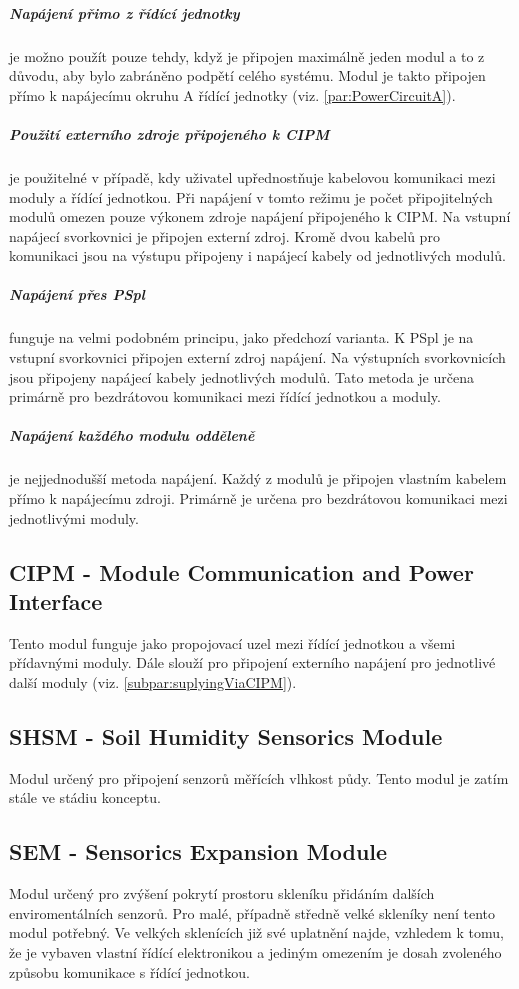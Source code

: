 \subparagraph{Napájení přimo z řídící jednotky}
je možno použít pouze tehdy, když je připojen maximálně jeden modul a to z důvodu, aby bylo zabráněno podpětí celého systému.
Modul je takto připojen přímo k napájecímu okruhu A řídící jednotky (viz. \autoref{par:PowerCircuitA}).

\subparagraph{Použití externího zdroje připojeného k CIPM}
\label{subpar:suplyingViaCIPM}
je použitelné v případě, kdy uživatel upřednostňuje kabelovou komunikaci mezi moduly a řídící jednotkou.
Při napájení v tomto režimu je počet připojitelných modulů omezen pouze výkonem zdroje napájení připojeného k CIPM.
Na vstupní napájecí svorkovnici je připojen externí zdroj. 
Kromě dvou kabelů pro komunikaci jsou na výstupu připojeny i napájecí kabely od jednotlivých modulů.

\subparagraph{Napájení přes PSpl}
funguje na velmi podobném principu, jako předchozí varianta. 
K PSpl je na vstupní svorkovnici připojen externí zdroj napájení.
Na výstupních svorkovnicích jsou připojeny napájecí kabely jednotlivých modulů.
Tato metoda je určena primárně pro bezdrátovou komunikaci mezi řídící jednotkou a moduly.

\subparagraph{Napájení každého modulu odděleně}
je nejjednodušší metoda napájení.
Každý z modulů je připojen vlastním kabelem přímo k napájecímu zdroji.
Primárně je určena pro bezdrátovou komunikaci mezi jednotlivými moduly. 

\subsection{CIPM - Module Communication and Power Interface}
\label{subsec:CIPM}
Tento modul funguje jako propojovací uzel mezi řídící jednotkou a všemi přídavnými moduly.
Dále slouží pro připojení externího napájení pro jednotlivé další moduly (viz. \autoref{subpar:suplyingViaCIPM}).

\subsection{SHSM - Soil Humidity Sensorics Module}
\label{subsec:SHSM}
Modul určený pro připojení senzorů měřících vlhkost půdy.
Tento modul je zatím stále ve stádiu konceptu.

\subsection{SEM - Sensorics Expansion Module}
\label{subsec:SEM}
Modul určený pro zvýšení pokrytí prostoru skleníku přidáním dalších enviromentálních senzorů.
Pro malé, případně středně velké skleníky není tento modul potřebný. 
Ve velkých sklenících již své uplatnění najde, vzhledem k tomu, že je vybaven vlastní řídící elektronikou a jediným omezením je dosah zvoleného způsobu komunikace s řídící jednotkou.

